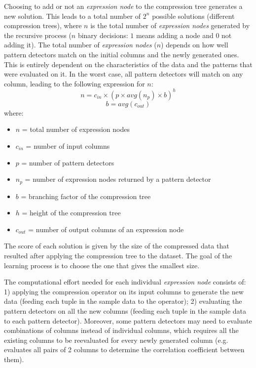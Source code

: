 Choosing to add or not an \textit{expression node} to the compression tree generates a new solution. This leads to a total number of \(2^n\) possible solutions (different compression trees), where \(n\) is the total number of \textit{expression nodes} generated by the recursive process (\(n\) binary decisions: \(1\) means adding a node and \(0\) not adding it). The total number of \textit{expression nodes} (\(n\)) depends on how well pattern detectors match on the initial columns and the newly generated ones. This is entirely dependent on the characteristics of the data and the patterns that were evaluated on it. In the worst case, all pattern detectors will match on any column, leading to the following expression for \(n\):
\begin{equation}
\label{eq:optimizationproblem:n}
    n = c_{in} \times (p \times \mathit{avg}(n_{p}) \times b) ^ h
\end{equation}
\begin{equation}
\label{eq:optimizationproblem:b}
    b = \mathit{avg}(c_{out})
\end{equation}
where:
\begin{itemize}
    \item[] \(n\) = total number of expression nodes
    \item[] \(c_{in}\) = number of input columns
    \item[] \(p\) = number of pattern detectors
    \item[] \(n_{p}\) = number of expression nodes returned by a pattern detector
    \item[] \(b\) = branching factor of the compression tree
    \item[] \(h\) = height of the compression tree
    \item[] \(c_{out}\) = number of output columns of an expression node
\end{itemize}


The score of each solution is given by the size of the compressed data that resulted after applying the compression tree to the dataset. The goal of the learning process is to choose the one that gives the smallest size.

The computational effort needed for each individual \textit{expression node} consists of: 1) applying the compression operator on its input columns to generate the new data (feeding each tuple in the sample data to the operator); 2) evaluating the pattern detectors on all the new columns (feeding each tuple in the sample data to each pattern detector). Moreover, some pattern detectors may need to evaluate combinations of columns instead of individual columns, which requires all the existing columns to be reevaluated for every newly generated column (e.g.  evaluates all pairs of 2 columns to determine the correlation coefficient between them).

\iffalse
TODO:
better formalize problem
\fi

